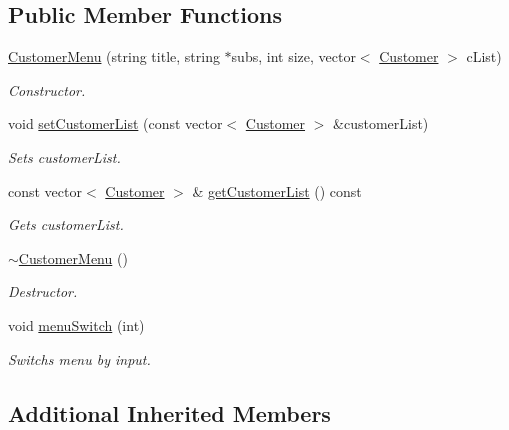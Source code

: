 \subsection*{Public Member Functions}
\begin{DoxyCompactItemize}
\item 
\mbox{\label{classCustomerMenu_a05bf66ccf5ce81d26cc4e39fbc2dbb64}} 
\hyperlink{classCustomerMenu_a05bf66ccf5ce81d26cc4e39fbc2dbb64}{Customer\+Menu} (string title, string $\ast$subs, int size, vector$<$ \hyperlink{classCustomer}{Customer} $>$ c\+List)
\begin{DoxyCompactList}\small\item\em Constructor. \end{DoxyCompactList}\item 
void \hyperlink{classCustomerMenu_abd785329cc569b15848388dd9e193613}{set\+Customer\+List} (const vector$<$ \hyperlink{classCustomer}{Customer} $>$ \&customer\+List)
\begin{DoxyCompactList}\small\item\em Sets customer\+List. \end{DoxyCompactList}\item 
const vector$<$ \hyperlink{classCustomer}{Customer} $>$ \& \hyperlink{classCustomerMenu_a633a6392060ef6e6bdb94ea6d554429c}{get\+Customer\+List} () const
\begin{DoxyCompactList}\small\item\em Gets customer\+List. \end{DoxyCompactList}\item 
\hyperlink{classCustomerMenu_aa28a689d645c7df53e2d714195fcf08e}{$\sim$\+Customer\+Menu} ()
\begin{DoxyCompactList}\small\item\em Destructor. \end{DoxyCompactList}\item 
void \hyperlink{classCustomerMenu_a9c43057a2fdd5fa1323e4cc1ec54f4be}{menu\+Switch} (int)
\begin{DoxyCompactList}\small\item\em Switchs menu by input. \end{DoxyCompactList}\end{DoxyCompactItemize}
\subsection*{Additional Inherited Members}


